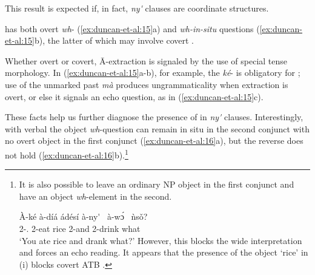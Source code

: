 \documentclass[output=paper]{../langsci/langscibook}
\begin{document}
\noindent This result is expected if, in fact, \textit{ny\'{\textturnv}\ng} clauses are coordinate structures.

 has both overt \textit{wh}- (\ref{ex:duncan-et-al:15}a) and \textit{wh-in-situ} questions (\ref{ex:duncan-et-al:15}b), the latter of which may involve covert .

\ea\label{ex:duncan-et-al:15}
\z
\z

\noindent Whether overt or covert, \={A}-extraction is signaled by the use of special  tense morphology. In (\ref{ex:duncan-et-al:15}a-b), for example, the  \textit{k\'{e}}- is obligatory for ; use of the unmarked past  \textit{m\`{a}} produces ungrammaticality when extraction is overt, or else it signals an echo question, as in (\ref{ex:duncan-et-al:15}c).

These facts help us further diagnose the presence of  in \textit{ny\'{\textturnv}\ng} clauses. Interestingly, with verbal  the object \textit{wh}-question can remain {in situ} in the second conjunct with no overt object in the first conjunct (\ref{ex:duncan-et-al:16}a), but the reverse does not hold (\ref{ex:duncan-et-al:16}b).\footnote{It is also possible to leave an ordinary NP object in the first conjunct and have an object \textit{wh}-element in the second.

\ea\label{ex:duncan-et-al:i}
\gll \`{A}-k\'{e} \`{a}-d\'{i}\'{a} \'{a}d\'{e}s\'{i} \`{a}-ny\'{\textturnv}\ng~ \`{a}-\ng w\'ɔ\ng~ \`{n}s\v{o}? \\
2{\sg-\pst.\foc} 2{\sg}-eat rice 2{\sg}-and 2{\sg}-drink what \\
\glt `You ate rice and drank what?'
\z
However, this blocks the wide  interpretation and forces an echo reading. It appears that the presence of the object `rice' in (i) blocks covert ATB .}
\end{document}
